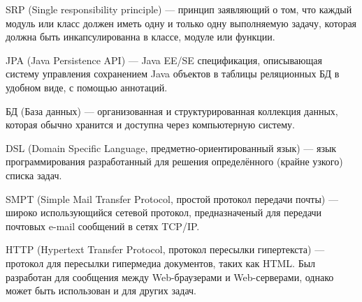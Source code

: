 \hypertarget{gloss:srp}{
    SRP (Single responsibility principle) --- принцип заявляющий о том, что каждый модуль или класс должен иметь одну и только одну выполняемую задачу, которая должна быть инкапсулированна в классе, модуле или функции.\cite{srp}
}

\hypertarget{gloss:jpa}{
    JPA (Java Persistence API) --- Java EE/SE спецификация, описывающая систему управления сохранением Java объектов в таблицы реляционных БД в удобном виде, с помощью аннотаций.\cite{jpa}
}

\hypertarget{gloss:db}{
    БД (База данных) --- организованная и структурированная коллекция данных, которая обычно хранится и доступна через компьютерную систему.
}

\hypertarget{gloss:dsl}{
    DSL (Domain Specific Language, предметно-ориентированный язык) --- язык программирования разработанный для решения определённого (крайне узкого) списка задач. 
}

\hypertarget{gloss:smtp}{
    SMPT (Simple Mail Transfer Protocol, простой протокол передачи почты) --- широко использующийся сетевой протокол, предназначеный для передачи почтовых e-mail сообщений в сетях TCP/IP.\cite{smpt} 
}

\hypertarget{gloss:http}{
    HTTP (Hypertext Transfer Protocol, протокол пересылки гипертекста) --- протокол для пересылки гипермедиа документов, таких как HTML.
    Был разработан для сообщения между Web-браузерами и Web-серверами, однако может быть использован и для других задач.\cite{http}
}

\clearpage